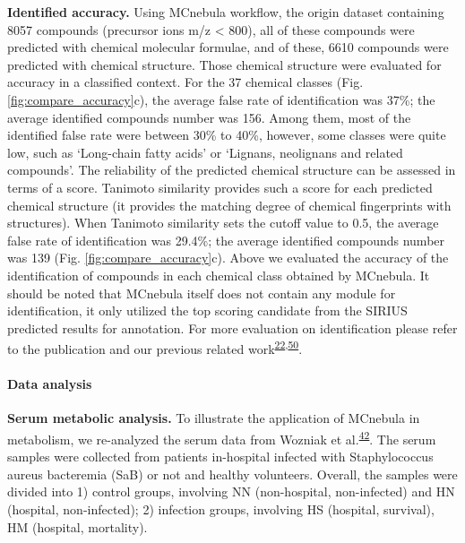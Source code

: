 \documentclass[
]{article}
\begin{document}
\textbf{Identified accuracy.} Using MCnebula workflow, the origin
dataset containing 8057 compounds (precursor ions m/z \textless{} 800),
all of these compounds were predicted with chemical molecular formulae,
and of these, 6610 compounds were predicted with chemical structure.
Those chemical structure were evaluated for accuracy in a classified
context. For the 37 chemical classes (Fig. \ref{fig:compare_accuracy}c),
the average false rate of identification was 37\%; the average
identified compounds number was 156. Among them, most of the identified
false rate were between 30\% to 40\%, however, some classes were quite
low, such as `Long-chain fatty acids' or `Lignans, neolignans and
related compounds'. The reliability of the predicted chemical structure
can be assessed in terms of a score. Tanimoto similarity provides such a
score for each predicted chemical structure (it provides the matching
degree of chemical fingerprints with structures). When Tanimoto
similarity sets the cutoff value to 0.5, the average false rate of
identification was 29.4\%; the average identified compounds number was
139 (Fig. \ref{fig:compare_accuracy}c). Above we evaluated the accuracy
of the identification of compounds in each chemical class obtained by
MCnebula. It should be noted that MCnebula itself does not contain any
module for identification, it only utilized the top scoring candidate
from the SIRIUS predicted results for annotation. For more evaluation on
identification please refer to the publication and our previous related
work\textsuperscript{\protect\hyperlink{ref-duhrkop_sirius_2019}{22},\protect\hyperlink{ref-lai_deep_2022}{50}}.

\hypertarget{data-analysis}{%
\paragraph{Data analysis}\label{data-analysis}}

\textbf{Serum metabolic analysis.} To illustrate the application of
MCnebula in metabolism, we re-analyzed the serum data from Wozniak et
al.\textsuperscript{\protect\hyperlink{ref-2020s}{42}}. The serum
samples were collected from patients in-hospital infected with
Staphylococcus aureus bacteremia (SaB) or not and healthy volunteers.
Overall, the samples were divided into 1) control groups, involving NN
(non-hospital, non-infected) and HN (hospital, non-infected); 2)
infection groups, involving HS (hospital, survival), HM (hospital,
mortality).
\end{document}
